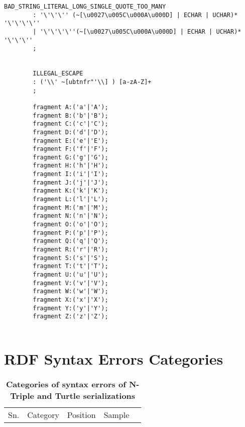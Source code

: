 \begin{appendices}
\begin{lstlisting}[breaklines,basicstyle=\ttfamily]
		BAD_STRING_LITERAL_LONG_SINGLE_QUOTE_TOO_MANY
		: '\'\'\'' (~[\u0027\u005C\u000A\u000D] | ECHAR | UCHAR)*  '\'\'\'\''
		| '\'\'\'\''(~[\u0027\u005C\u000A\u000D] | ECHAR | UCHAR)*  '\'\'\''
		;
		
		
		ILLEGAL_ESCAPE
		: ('\\' ~[ubtnfr"'\\] ) [a-zA-Z]+ 
		;
		
		fragment A:('a'|'A');
		fragment B:('b'|'B');
		fragment C:('c'|'C');
		fragment D:('d'|'D');
		fragment E:('e'|'E');
		fragment F:('f'|'F');
		fragment G:('g'|'G');
		fragment H:('h'|'H');
		fragment I:('i'|'I');
		fragment J:('j'|'J');
		fragment K:('k'|'K');
		fragment L:('l'|'L');
		fragment M:('m'|'M');
		fragment N:('n'|'N');
		fragment O:('o'|'O');
		fragment P:('p'|'P');
		fragment Q:('q'|'Q');
		fragment R:('r'|'R');
		fragment S:('s'|'S');
		fragment T:('t'|'T');
		fragment U:('u'|'U');
		fragment V:('v'|'V');
		fragment W:('w'|'W');
		fragment X:('x'|'X');
		fragment Y:('y'|'Y');
		fragment Z:('z'|'Z');	


\end{lstlisting}

\chapter{RDF Syntax Errors Categories }
\label{ch:synErrCategories}


\setcounter{cA}{1}
\begin{longtable}{|c|p{3cm}|p{3cm}|l|l}
\caption{\textbf{Categories of syntax errors of N-Triple and Turtle serializations}}
\label{tab:syntaxErrorCate}
\centering
\cline{2-5}
Sn. & Category & Position & Sample &  \\  
\cline{1-4}


\end{longtable}
\end{appendices}
